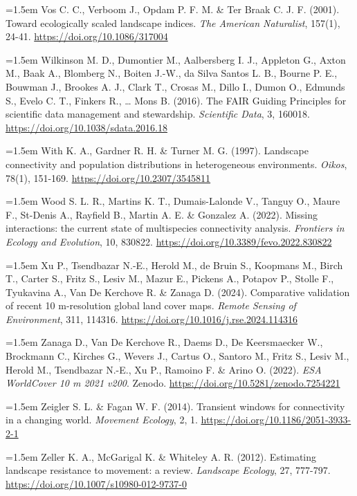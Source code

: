 \documentclass[a4paper,12pt]{report}
\begin{document}
\noindent\hangindent=1.5em Vos C. C., Verboom J., Opdam P. F. M. \& Ter Braak C. J. F. (2001). Toward ecologically scaled landscape indices. \textit{The American Naturalist}, 157(1), 24-41. \url{https://doi.org/10.1086/317004}\par\medskip
\noindent\hangindent=1.5em Wilkinson M. D., Dumontier M., Aalbersberg I. J., Appleton G., Axton M., Baak A., Blomberg N., Boiten J.-W., da Silva Santos L. B., Bourne P. E., Bouwman J., Brookes A. J., Clark T., Crosas M., Dillo I., Dumon O., Edmunds S., Evelo C. T., Finkers R., … Mons B. (2016). The FAIR Guiding Principles for scientific data management and stewardship. \textit{Scientific Data}, 3, 160018. \url{https://doi.org/10.1038/sdata.2016.18}\par\medskip
\noindent\hangindent=1.5em With K. A., Gardner R. H. \& Turner M. G. (1997). Landscape connectivity and population distributions in heterogeneous environments. \textit{Oikos}, 78(1), 151-169. \url{https://doi.org/10.2307/3545811}\par\medskip
\noindent\hangindent=1.5em Wood S. L. R., Martins K. T., Dumais-Lalonde V., Tanguy O., Maure F., St-Denis A., Rayfield B., Martin A. E. \& Gonzalez A. (2022). Missing interactions: the current state of multispecies connectivity analysis. \textit{Frontiers in Ecology and Evolution}, 10, 830822. \url{https://doi.org/10.3389/fevo.2022.830822}\par\medskip
\noindent\hangindent=1.5em Xu P., Tsendbazar N.-E., Herold M., de Bruin S., Koopmans M., Birch T., Carter S., Fritz S., Lesiv M., Mazur E., Pickens A., Potapov P., Stolle F., Tyukavina A., Van De Kerchove R. \& Zanaga D. (2024). Comparative validation of recent 10 m-resolution global land cover maps. \textit{Remote Sensing of Environment}, 311, 114316. \url{https://doi.org/10.1016/j.rse.2024.114316}\par\medskip
\noindent\hangindent=1.5em Zanaga D., Van De Kerchove R., Daems D., De Keersmaecker W., Brockmann C., Kirches G., Wevers J., Cartus O., Santoro M., Fritz S., Lesiv M., Herold M., Tsendbazar N.-E., Xu P., Ramoino F. \& Arino O. (2022). \textit{ESA WorldCover 10 m 2021 v200}. Zenodo. \url{https://doi.org/10.5281/zenodo.7254221}\par\medskip
\noindent\hangindent=1.5em Zeigler S. L. \& Fagan W. F. (2014). Transient windows for connectivity in a changing world. \textit{Movement Ecology}, 2, 1. \url{https://doi.org/10.1186/2051-3933-2-1}\par\medskip
\noindent\hangindent=1.5em Zeller K. A., McGarigal K. \& Whiteley A. R. (2012). Estimating landscape resistance to movement: a review. \textit{Landscape Ecology}, 27, 777-797. \url{https://doi.org/10.1007/s10980-012-9737-0}\par\medskip
\end{document}
